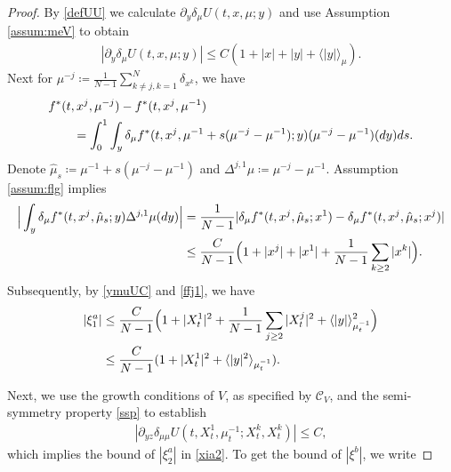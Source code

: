 \documentclass[10pt,a4paper]{amsart}
\def\cal{\mathcal}
\begin{document}
\begin{proof}
By \eqref{defUU} we calculate $\partial_y \delta_\mu U(t, x, \mu;y)$
and use Assumption \ref{assum:meV} to  obtain
\begin{align}
|\partial_y\delta_\mu U(t, x, \mu;y)|\le C(1+|x|+|y|+\langle|y|\rangle_\mu).
\label{ymuUC}
\end{align}
Next for $\mu^{-j}\coloneqq \frac{1}{N-1}\sum_{k\ne j, k=1}^N \delta_{x^k}$, we have
\begin{align}
&f^*(t, x^j, \mu^{-j})-f^*(t, x^j, \mu^{-1}) \label{ffj1}  \\
&\qquad =
\int_0^1 \int_y\delta_\mu f^*(t, x^j, \mu^{-1} +s(\mu^{-j}-\mu^{-1}) ;y) (\mu^{-j}-\mu^{-1}) (dy)ds. \notag
\end{align}
Denote $\hat \mu_s\coloneqq  \mu^{-1} +s(\mu^{-j}-\mu^{-1})$
and $\Delta^{j,1} \mu\coloneqq \mu^{-j}-\mu^{-1}  $.
  Assumption \ref{assum:flg} implies
\begin{align}
\Big|\int_y \delta_\mu f^*(t, x^j, \hat \mu_s;y)  \Delta^{j,1} \mu (dy)\Big| &=\frac{1}{N-1} |\delta_\mu f^*(t, x^j, \hat \mu_s;x^1)- \delta_\mu f^*(t, x^j, \hat \mu_s;x^j) | \notag \\
&\le \frac{C}{N-1} \Big(1+|x^j|+|x^1|+\frac{1}{N-1}\sum_{k\ge 2} |x^k|\Big).\notag
\end{align}
Subsequently, by \eqref{ymuUC} and \eqref{ffj1}, we have
\begin{align}
|\xi_1^a|&\le \frac{C}{N-1}\Big(1+|X_t^1|^2+\frac{1}{N-1}\sum_{j\ge 2}|X_t^j|^2+ \langle |y|\rangle^2_{\mu_t^{-1}}\Big)\\
&\le \frac{C}{N-1}(1+|X_t^1|^2+ \langle |y|^2\rangle_{\mu_t^{-1}}).\notag
\end{align}

Next, we use the growth conditions of $V$,  as specified by $ {\cal C}_V$, and the semi-symmetry property \eqref{ssp} to establish
\begin{align}
|\partial_{yz}
\delta_{\mu\mu}
U(t, X^1_t,\mu_t^{-1};X_t^k, X^k_t)|\le C,
\end{align}
which implies the bound of $|\xi_2^a|$ in  \eqref{xia2}.
To get the bound of $|\xi^b|$, we write


\end{proof}
\end{document}
